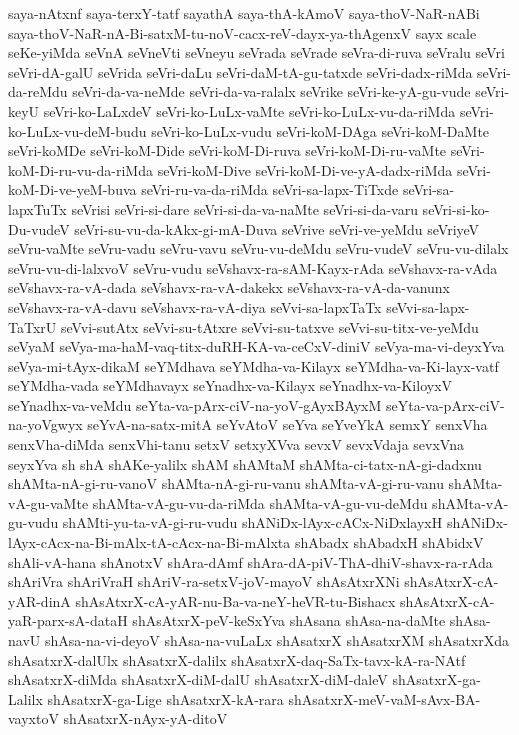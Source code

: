 {saya-nAtxnf
saya-terxY-tatf
sayathA
saya-thA-kAmoV
saya-thoV-NaR-nABi
saya-thoV-NaR-nA-Bi-satxM-tu-noV-cacx-reV-dayx-ya-thAgenxV
sayx
scale
seKe-yiMda
seVnA
seVneVti
seVneyu
seVrada
seVrade
seVra-di-ruva
seVralu
seVri
seVri-dA-galU
seVrida
seVri-daLu
seVri-daM-tA-gu-tatxde
seVri-dadx-riMda
seVri-da-reMdu
seVri-da-va-neMde
seVri-da-va-ralalx
seVrike
seVri-ke-yA-gu-vude
seVri-keyU
seVri-ko-LaLxdeV
seVri-ko-LuLx-vaMte
seVri-ko-LuLx-vu-da-riMda
seVri-ko-LuLx-vu-deM-budu
seVri-ko-LuLx-vudu
seVri-koM-DAga
seVri-koM-DaMte
seVri-koMDe
seVri-koM-Dide
seVri-koM-Di-ruva
seVri-koM-Di-ru-vaMte
seVri-koM-Di-ru-vu-da-riMda
seVri-koM-Dive
seVri-koM-Di-ve-yA-dadx-riMda
seVri-koM-Di-ve-yeM-buva
seVri-ru-va-da-riMda
seVri-sa-lapx-TiTxde
seVri-sa-lapxTuTx
seVrisi
seVri-si-dare
seVri-si-da-va-naMte
seVri-si-da-varu
seVri-si-ko-Du-vudeV
seVri-su-vu-da-kAkx-gi-mA-Duva
seVrive
seVri-ve-yeMdu
seVriyeV
seVru-vaMte
seVru-vadu
seVru-vavu
seVru-vu-deMdu
seVru-vudeV
seVru-vu-dilalx
seVru-vu-di-lalxvoV
seVru-vudu
seVshavx-ra-sAM-Kayx-rAda
seVshavx-ra-vAda
seVshavx-ra-vA-dada
seVshavx-ra-vA-dakekx
seVshavx-ra-vA-da-vanunx
seVshavx-ra-vA-davu
seVshavx-ra-vA-diya
seVvi-sa-lapxTaTx
seVvi-sa-lapx-TaTxrU
seVvi-sutAtx
seVvi-su-tAtxre
seVvi-su-tatxve
seVvi-su-titx-ve-yeMdu
seVyaM
seVya-ma-haM-vaq-titx-duRH-KA-va-ceCxV-diniV
seVya-ma-vi-deyxYva
seVya-mi-tAyx-dikaM
seYMdhava
seYMdha-va-Kilayx
seYMdha-va-Ki-layx-vatf
seYMdha-vada
seYMdhavayx
seYnadhx-va-Kilayx
seYnadhx-va-KiloyxV
seYnadhx-va-veMdu
seYta-va-pArx-ciV-na-yoV-gAyxBAyxM
seYta-va-pArx-ciV-na-yoVgwyx
seYvA-na-satx-mitA
seYvAtoV
seYva
seYveYkA
semxY
senxVha
senxVha-diMda
senxVhi-tanu
setxV
setxyXVva
sevxV
sevxVdaja
sevxVna
seyxYva
sh
shA
shAKe-yalilx
shAM
shAMtaM
shAMta-ci-tatx-nA-gi-dadxnu
shAMta-nA-gi-ru-vanoV
shAMta-nA-gi-ru-vanu
shAMta-vA-gi-ru-vanu
shAMta-vA-gu-vaMte
shAMta-vA-gu-vu-da-riMda
shAMta-vA-gu-vu-deMdu
shAMta-vA-gu-vudu
shAMti-yu-ta-vA-gi-ru-vudu
shANiDx-lAyx-cACx-NiDxlayxH
shANiDx-lAyx-cAcx-na-Bi-mAlx-tA-cAcx-na-Bi-mAlxta
shAbadx
shAbadxH
shAbidxV
shAli-vA-hana
shAnotxV
shAra-dAmf
shAra-dA-piV-ThA-dhiV-shavx-ra-rAda
shAriVra
shAriVraH
shAriV-ra-setxV-joV-mayoV
shAsAtxrXNi
shAsAtxrX-cA-yAR-dinA
shAsAtxrX-cA-yAR-nu-Ba-va-neY-heVR-tu-Bishacx
shAsAtxrX-cA-yaR-parx-sA-dataH
shAsAtxrX-peV-keSxYva
shAsana
shAsa-na-daMte
shAsa-navU
shAsa-na-vi-deyoV
shAsa-na-vuLaLx
shAsatxrX
shAsatxrXM
shAsatxrXda
shAsatxrX-dalUlx
shAsatxrX-dalilx
shAsatxrX-daq-SaTx-tavx-kA-ra-NAtf
shAsatxrX-diMda
shAsatxrX-diM-dalU
shAsatxrX-diM-daleV
shAsatxrX-ga-Lalilx
shAsatxrX-ga-Lige
shAsatxrX-kA-rara
shAsatxrX-meV-vaM-sAvx-BA-vayxtoV
shAsatxrX-nAyx-yA-ditoV
}
